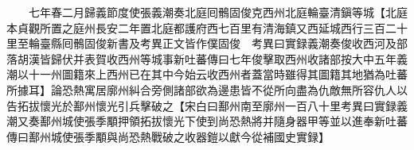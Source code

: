 　　七年春二月歸義節度使張義潮奏北庭囘鶻固俊克西州北庭輪臺清鎭等城【北庭本貞觀所置之庭州長安二年置北庭都護府西七百里有清海鎮又西延城西行三百二十里至輪臺縣囘鶻固俊新書及考異正文皆作僕固俊　考異曰實録義潮奏俊收西河及部落胡漢皆歸伏并表賀收西州等城事新吐蕃傳曰七年俊擊取西州收諸部按大中五年義潮以十一州圖籍來上西州已在其中今始云收西州者蓋當時雖得其圖籍其地猶為吐蕃所據耳】論恐熱寓居廓州糾合旁側諸部欲為邊患皆不從所向盡為仇敵無所容仇人以告拓拔懷光於鄯州懷光引兵擊破之【宋白曰鄯州南至廓州一百八十里考異曰實録義潮又奏鄯州城使張季顒押領拓拔懷光下使到尚恐熱將并隨身器甲等並以進奉新吐蕃傳曰鄯州城使張季顒與尚恐熱戰破之收器鎧以獻今從補國史實録】　